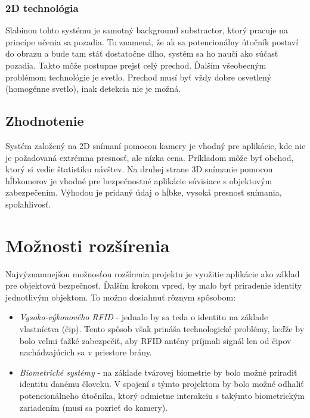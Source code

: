 \subsubsection{2D technológia}
Slabinou tohto systému je samotný background substractor, ktorý pracuje na princípe učenia sa pozadia. To znamená, že ak sa potencionálny útočník postaví do obrazu a bude tam stáť dostatočne dlho, systém sa ho naučí ako súčasť pozadia. Takto môže postupne prejsť celý prechod. Ďalším všeobecným problémom technológie je svetlo. Prechod musí byť vždy dobre osvetlený (homogénne svetlo), inak detekcia nie je možná. 

\vspace{5mm}

\subsection{Zhodnotenie}
Systém založený na 2D snímaní pomocou kamery je vhodný pre aplikácie, kde nie je požadovaná extrémna presnosť, ale nízka cena. Príkladom môže byť obchod, ktorý si vedie štatistiku návštev. Na druhej strane 3D snímanie pomocou hĺbkomerov je vhodné pre bezpečnostné aplikácie súvisiace s objektovým zabezpečením. Výhodou je pridaný údaj o hĺbke, vysoká presnosť snímania, spoľahlivosť.       


\section{Možnosti rozšírenia}
Najvýznamnejšou možnosťou rozšírenia projektu je využitie aplikácie ako základ pre objektovú bezpečnosť. Ďalším krokom vpred, by malo byť priradenie identity jednotlivým objektom. To možno dosiahnuť rôznym spôsobom: 

\begin{itemize}
\item \textit{Vysoko-výkonového RFID} - jednalo by sa teda o identitu na základe vlastníctva (čip). Tento spôsob však prináša technologické problémy, keďže by bolo veľmi ťažké zabezpečiť, aby RFID antény príjmali signál len od čipov nachádzajúcich sa v priestore brány. 
\item \textit{Biometrické systémy} - na základe tvárovej biometrie by bolo možné priradiť identitu danému človeku. V spojení s týmto projektom by bolo možné odhaliť potencionálneho útočníka, ktorý odmietne interakciu s takýmto biometrickým zariadením (musí sa pozrieť do kamery). 
\end{itemize}


